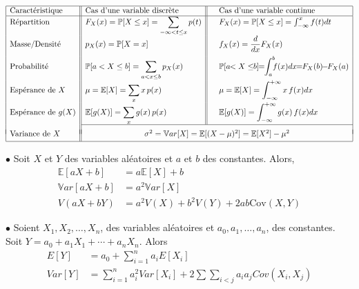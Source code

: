 \documentclass[12pt,french]{article}
\begin{document}
\begin{displaymath}
\begin{array}{|l||l||cl|}
\hline
\mbox{Caract\'eristique}&\mbox{Cas d'une variable discr\`ete} & &\mbox{Cas d'une variable continue}\\
\hline
\mbox{R\'epartition}&\displaystyle F_X(x)=
{\mathbb P}[X \le x]=\sum_{-\infty < t \le x}p(t) & &
F_X(x)= {\mathbb P}[X \le x]=\int_{-\infty}^{x}f(t)dt
\\[.10cm]
\mbox{Masse/Densit\'e}&\displaystyle p_X(x) = {\mathbb P}[X=x]
& &
\displaystyle f_X(x) = \frac{d}{dx}F_X(x)
\\[.30cm]
\mbox{Probabilit\'e}&\displaystyle{\mathbb P}[a < X \le b]=\sum_{a < x \le b}p_X(x)
& &
\displaystyle{\mathbb P}[a\!\! < X \le\!\! b]\!\!=\!\!\int_{a}^{b}\!\!\!f(x)dx\!\!=\!\!F_X(b)\!\!-\!\!F_X(a)
\\[.10cm]
\mbox{Esp\'erance de $X$}&\displaystyle \mu = {\mathbb E}[X]=\sum_{
x} x\,p(x) & & \displaystyle \mu = {\mathbb
E}[X]=\int_{-\infty}^{+\infty}x\,f(x)dx
\\[.10cm]
\mbox{Esp\'erance de $g(X)$}&\displaystyle {\mathbb E}[g(X)]=\sum_{
x} g(x)\,p(x) & & \displaystyle {\mathbb
E}[g(X)]=\int_{-\infty}^{+\infty}g(x)\,f(x)dx
\\[.10cm]
\cline{2-4}
& \multicolumn{3}{c|}{}\\[-0.2cm]
\mbox{Variance de $X$}& \multicolumn{3}{c|}{\sigma^2 = {\mathbb Var}[X]={\mathbb E}[(X-\mu)^2]
={\mathbb E}[X^{2}]-\mu^2}
\\[.10cm]
\hline
\end{array}
\end{displaymath}

\hspace{5cm}

\vspace{0.1in}
$\bullet$  Soit $X$ et $Y$ des variables aléatoires et $a$ et $b$ des constantes. Alors,
{\small
\begin{align*}
{\mathbb E}[aX+b]&=a{\mathbb E}[X]+b \\
{\mathbb Var}[aX+b]&=a^{2}{\mathbb Var}[X]  \\
V(aX+bY) &= a^{2}V(X) + b^{2}V(Y) +2ab\mbox{Cov}(X, Y)
\end{align*}
}

\vspace{0.1in}
$\bullet$ Soient $X_1,X_2,\ldots,X_n$, des variables al\'eatoires et $a_0,a_1,\ldots,a_n$, des constantes.\\
 Soit $Y=a_0+a_1X_1+\cdots+a_nX_n$. Alors 
 {\small
\begin{align*}
E[Y]&=a_0+\sum_{i=1}^na_iE[X_i]\\
Var[Y] &=\sum_{i=1}^na_i^2Var[X_i]+2\sum\sum\limits_{i<j}a_ia_jCov(X_i,X_j)
\end{align*}
}
\end{document}
